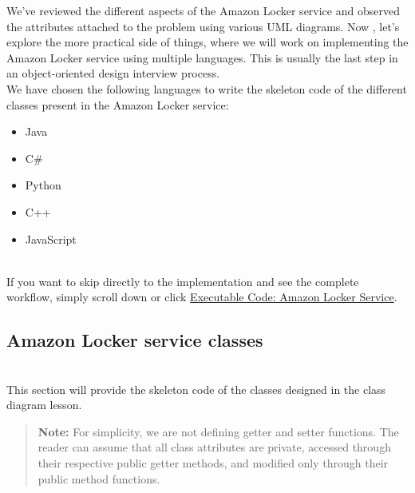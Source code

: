 

We've reviewed the different aspects of the Amazon Locker service and observed the attributes attached to the problem using various UML diagrams. Now , let's explore the more practical side of things, where we will work on implementing the Amazon Locker service using multiple languages. This is usually the last step in an object-oriented design interview process.
\\
We have chosen the following languages to write the skeleton code of the different classes present in the Amazon Locker service:

\begin{itemize}
\item
\protect{}\label{JNgGrbA9GirU9MozwFkJx}
Java
\item
\protect{}\label{KRqux_dvybBrdjIBDYF1k}
C\#
\item
\protect{}\label{BhuuCbHsW8jLamvgW3XHv}
Python
\item
\protect{}\label{8PUncNirwI1FO1ZH7k4gD}
C++
\item
\protect{}\label{qiA6WZ9TolofFERJcTfrS}
JavaScript
\end{itemize}
\\
If you want to skip directly to the implementation and see the complete workflow, simply scroll down or click \hyperref[Executable-Code-Amazon-Locker-Service]{Executable Code: Amazon Locker Service}.

\subsection{Amazon Locker service classes}\label{EIKMqCCV3x96dU5SGxf6I}
\\
This section will provide the skeleton code of the classes designed in the class diagram lesson.
\begin{quote}
\textbf{Note:} For simplicity, we are not defining getter and setter functions. The reader can assume that all class attributes are private, accessed through their respective public getter methods, and modified only through their public method functions.
\end{quote}
